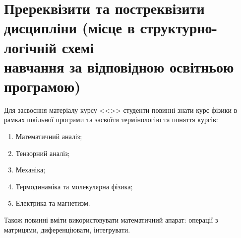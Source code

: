\documentclass{Syllabus}
\begin{document}
\begin{enumerate}
\end{enumerate}


\section{Пререквізити та постреквізити дисципліни (місце в структурно-логічній схемі\\ навчання за відповідною освітньою програмою)}


Для засвоєння матеріалу курсу <<\discipline>> студенти повинні знати курс фізики в рамках шкільної програми та засвоїти термінологію та поняття курсів:
\begin{enumerate}
    \item Математичний аналіз;
    \item Тензорний аналіз;
    \item Механіка;
    \item Термодинаміка та молекулярна фізика;
    \item Електрика та магнетизм.
\end{enumerate}

Також повинні вміти використовувати математичний апарат: операції з матрицями,  диференціювати, інтегрувати.
\end{document}
